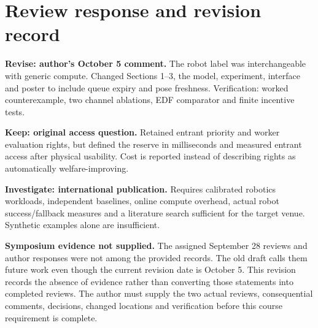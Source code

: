 \section{Review response and revision record}
\textbf{Revise: author's October 5 comment.} The robot label was interchangeable with generic compute. Changed Sections 1--3, the model, experiment, interface and poster to include queue expiry and pose freshness. Verification: worked counterexample, two channel ablations, EDF comparator and finite incentive tests.

\textbf{Keep: original access question.} Retained entrant priority and worker evaluation rights, but defined the reserve in milliseconds and measured entrant access after physical usability. Cost is reported instead of describing rights as automatically welfare-improving.

\textbf{Investigate: international publication.} Requires calibrated robotics workloads, independent baselines, online compute overhead, actual robot success/fallback measures and a literature search sufficient for the target venue. Synthetic examples alone are insufficient.

\textbf{Symposium evidence not supplied.} The assigned September 28 reviews and author responses were not among the provided records. The old draft calls them future work even though the current revision date is October 5. This revision records the absence of evidence rather than converting those statements into completed reviews. The author must supply the two actual reviews, consequential comments, decisions, changed locations and verification before this course requirement is complete.

\clearpage\onecolumn
